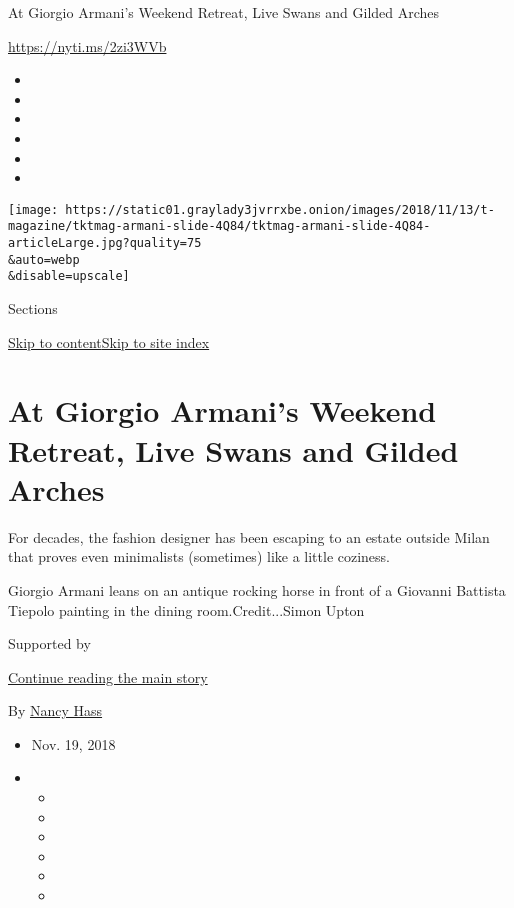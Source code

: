 At Giorgio Armani's Weekend Retreat, Live Swans and Gilded Arches

\url{https://nyti.ms/2zi3WVb}

\begin{itemize}
\item
\item
\item
\item
\item
\item
\end{itemize}

\texttt{[image: https://static01.graylady3jvrrxbe.onion/images/2018/11/13/t-magazine/tktmag-armani-slide-4Q84/tktmag-armani-slide-4Q84-articleLarge.jpg?quality=75\\\&auto=webp\\\&disable=upscale]}

Sections

\protect\hyperlink{site-content}{Skip to
content}\protect\hyperlink{site-index}{Skip to site index}

\hypertarget{at-giorgio-armanis-weekend-retreat-live-swans-and-gilded-arches}{%
\section{At Giorgio Armani's Weekend Retreat, Live Swans and Gilded
Arches}\label{at-giorgio-armanis-weekend-retreat-live-swans-and-gilded-arches}}

For decades, the fashion designer has been escaping to an estate outside
Milan that proves even minimalists (sometimes) like a little coziness.

Giorgio Armani leans on an antique rocking horse in front of a Giovanni
Battista Tiepolo painting in the dining room.Credit...Simon Upton

Supported by

\protect\hyperlink{after-sponsor}{Continue reading the main story}

By \href{https://www.nytimes3xbfgragh.onion/by/nancy-hass}{Nancy Hass}

\begin{itemize}
\item
  Nov. 19, 2018
\item
  \begin{itemize}
  \item
  \item
  \item
  \item
  \item
  \item
  \end{itemize}
\end{itemize}

